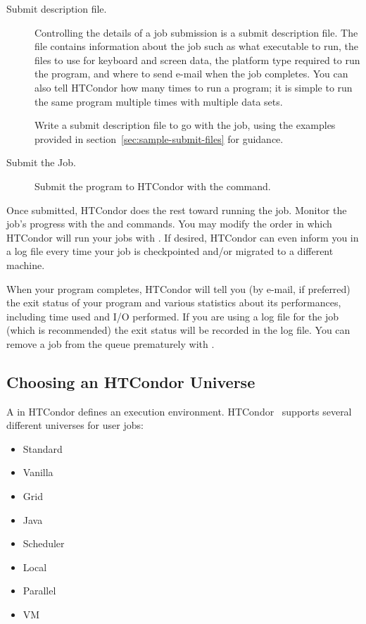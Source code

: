 \begin{description}
\item[Submit description file.]
Controlling the details of a job submission is a
submit description file.
The file contains information
about the job such as what executable to run, the
files to use for keyboard and screen data,
the platform type required to run the program, and
where to send e-mail when the job completes.
You can also tell HTCondor how many times to run a program;
it is simple to run the same program
multiple times with multiple data sets.

Write a submit description file to go with the job, using
the examples provided in section~\ref{sec:sample-submit-files}
for guidance.

\item[Submit the Job.]Submit the program to HTCondor with
the  command.

\end{description}

Once submitted, HTCondor does the rest toward running
the job.
Monitor the job's progress with the 
and  commands.
You may modify the order in which HTCondor will run your jobs with
. If desired, HTCondor can even inform you in a log file 
every time your job is checkpointed and/or migrated to a different machine. 

When your program completes, HTCondor will tell you
(by e-mail, if preferred) the exit status of your program and various
statistics about its performances, including time used and I/O performed.
If you are using a log file for the job (which is recommended) the exit
status will be recorded in the log file.
You can remove a job from the
queue prematurely with . 


\subsection{\label{sec:Choosing-Universe}
Choosing an HTCondor Universe}

A  in HTCondor
defines an execution environment. 
HTCondor \VersionNotice\ supports several different
universes for user jobs:
\begin{itemize}
	\item Standard
	\item Vanilla
	\item Grid
	\item Java
	\item Scheduler
	\item Local
 	\item Parallel
 	\item VM
\end{itemize}

